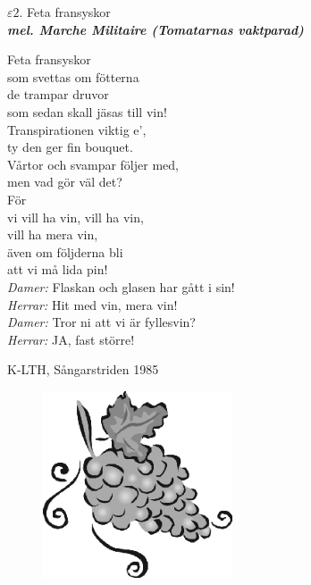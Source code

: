 \documentclass[a6paper,10pt]{article}
\newcommand{\mel}[1]{\small\textbf{\textit{mel. #1 \\}}}
\begin{document}
\setlength{\oddsidemargin}{-0.47in}
\noindent
\begin{center}
\Large $\varepsilon2$. Feta fransyskor \\ 
\mel{Marche Militaire (Tomatarnas vaktparad)}
\end{center}
Feta fransyskor \\
som svettas om fötterna\\
de trampar druvor \\
som sedan skall jäsas till vin!\\
Transpirationen viktig e', \\
ty den ger fin bouquet.\\
Vårtor och svampar följer med, \\
men vad gör väl det?\\
För \\
vi vill ha vin, vill ha vin, \\
vill ha mera vin,\\
även om följderna bli\\
att vi må lida pin!
\vspace{5pt}\\
\textit{Damer:} Flaskan och glasen har gått i sin!\\
\textit{Herrar:} Hit med vin, mera vin!\\
\textit{Damer:} Tror ni att vi är fyllesvin?\\
\textit{Herrar:} JA, fast större! 
\begin{flushright}
K-LTH, Sångarstriden 1985
\end{flushright}
\vfill
\begin{figure}[!h]
\includegraphics[width=0.5\textwidth]{grapes.png}
\end{figure}
\end{document}

